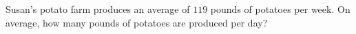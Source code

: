 Susan's potato farm produces an average of $119$ pounds of potatoes per week. On average, how many pounds of potatoes are produced per day?

